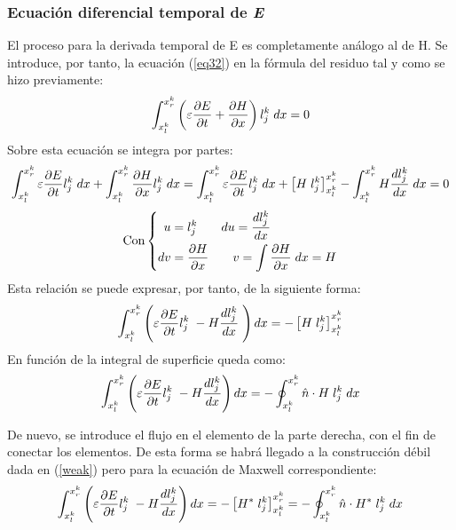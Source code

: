 \documentclass[11pt,a4paper,twoside,pdf]{article}
\numberwithin{equation}{section}
\begin{document}
\subsubsection{Ecuación diferencial temporal de \textit{E}}
El proceso para la derivada temporal de E es completamente análogo al de H. Se introduce, por tanto, la ecuación (\ref{eq32}) en la fórmula del residuo tal y como se hizo previamente:
\begin{equation}
    \int^{x^k_r}_{x^k_l}\left(\varepsilon\frac{\partial E}{\partial t}+\frac{\partial H}{\partial x}\right)l_j^k\;dx=0 \notag
\end{equation}
Sobre esta ecuación se integra por partes:
\begin{align}
    \int^{x^k_r}_{x^k_l}\varepsilon\frac{\partial E}{\partial t}l_j^k\;dx 
    + \int^{x^k_r}_{x^k_l}\frac{\partial H}{\partial x} l_j^k\;dx = \int^{x^k_r}_{x^k_l}\varepsilon\frac{\partial E}{\partial t}l_j^k\;dx \notag  + \left[H\;l_j^k\right]^{x^k_r}_{x^k_l}
    - \int^{x^k_r}_{x^k_l}H\frac{dl_j^k}{dx}\;dx = 0 \notag
\end{align}
\begin{equation}
        \text{Con}
\left\{
\begin{aligned}
u &= l_j^k \;\;\;\;\;\;\; du=\frac{dl_j^k}{dx} \\
dv &= \frac{\partial H}{\partial x}\;\;\;\;\;\;\; v=\int\frac{\partial H}{\partial x}\;dx=H
\end{aligned}
\right. \notag
\end{equation}
Esta relación se puede expresar, por tanto, de la siguiente forma:
\begin{equation}
\int^{x^k_r}_{x^k_l}\left(\varepsilon\frac{\partial E}{\partial t}l_j^k\;-H\frac{dl_j^k}{dx}\;\right)dx=-\left[H\;l_j^k\right]^{x^k_r}_{x^k_l}
    \notag
\end{equation}
En función de la integral de superficie queda como:
\begin{equation}
 \int^{x^k_r}_{x^k_l}\left(\varepsilon\frac{\partial E}{\partial t}l_j^k\;-H\frac{dl_j^k}{dx}\right)dx=-\oint^{x^k_r}_{x^k_l}\hat{n}\cdot H\;l_j^k\;dx
    \notag   
\end{equation}

De nuevo, se introduce el flujo en el elemento de la parte derecha, con el fin de conectar los elementos. De esta forma se habrá llegado a la construcción débil dada en (\ref{weak}) pero para la ecuación de Maxwell correspondiente:
\begin{equation}
    \int^{x^k_r}_{x^k_l}\left(\varepsilon\frac{\partial E}{\partial t}l_j^k\;-H\frac{dl_j^k}{dx}\right)dx=-\left[H^*\;l_j^k\right]^{x^k_r}_{x^k_l}=-\oint^{x^k_r}_{x^k_l}\hat{n}\cdot H^*\;l_j^k\;dx
    \notag    
\end{equation}
\end{document}
